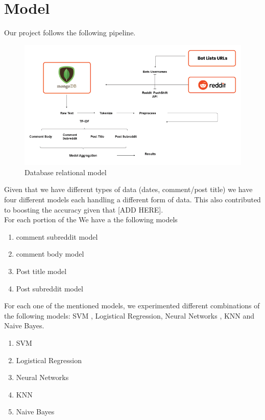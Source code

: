 \documentclass{article}
\begin{document}
\section{Model}
Our project follows the following pipeline. \par
\begin{figure}[H]
    \centering
    \includegraphics[width=15cm ,keepaspectratio]{pipeline}
    \caption{Database relational model}
\end{figure} 
    Given that we have different types of data (dates, comment/post title) we have four different models each handling a different form of data. This also contributed to boosting the accuracy given that [ADD HERE].\\
    For each portion of the
    We have a the following models
    \begin{enumerate}
        \item comment subreddit model
        \item comment body model
        \item Post title model
        \item Post subreddit model
    \end{enumerate}
    
    For each one of the mentioned models, we experimented different combinations of the following models: SVM , Logistical Regression, Neural Networks , KNN and Naive Bayes. 
        \begin{enumerate}
        \item SVM
        \item Logistical Regression
        \item Neural Networks
        \item KNN
        \item Naive Bayes
    \end{enumerate}
\end{document}
